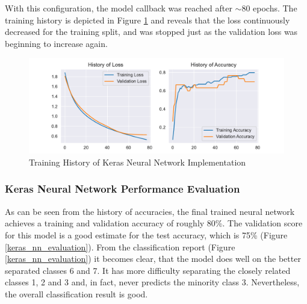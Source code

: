 With this configuration, the model callback was reached after $\sim 80$ epochs. The training history is depicted in Figure \ref{keras_nn_history} and reveals that the loss continuously decreased for the training split, and was stopped just as the validation loss was beginning to increase again. 

\begin{figure}[ht]
\centering
\includegraphics[scale=0.8 ]{figures/keras_nn_training.pdf}
\caption{Training History of Keras Neural Network Implementation}
\label{keras_nn_history}
\end{figure}

\subsubsection{Keras Neural Network Performance Evaluation}
As can be seen from the history of accuracies, the final trained neural network achieves a training and validation accuracy of roughly 80\%.  The validation score for this model is a good estimate for the test accuracy, which is 75\% (Figure \ref{keras_nn_evaluation}). From the classification report (Figure \ref{keras_nn_evaluation}) it becomes clear, that the model does well on the better separated classes 6 and 7. It has more difficulty separating the closely related classes 1, 2 and 3 and, in fact, never predicts the minority class 3. Nevertheless, the overall classification result is good.
\newline


